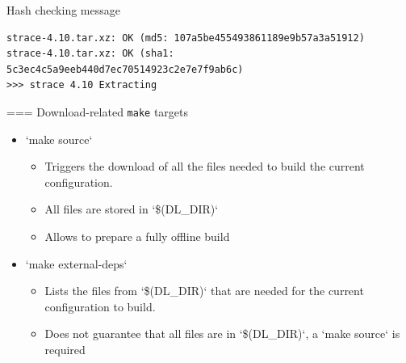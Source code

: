   \begin{block}{Hash checking message}
{\scriptsize
\begin{verbatim}
strace-4.10.tar.xz: OK (md5: 107a5be455493861189e9b57a3a51912)
strace-4.10.tar.xz: OK (sha1: 5c3ec4c5a9eeb440d7ec70514923c2e7e7f9ab6c)
>>> strace 4.10 Extracting
\end{verbatim}}
  \end{block}


=== {Download-related {\tt make} targets}
  \begin{itemize}
  \item `make source`
    \begin{itemize}
    \item Triggers the download of all the files needed to build the
      current configuration.
    \item All files are stored in `\$(DL_DIR)`
    \item Allows to prepare a fully offline build
    \end{itemize}
  \item `make external-deps`
    \begin{itemize}
    \item Lists the files from `\$(DL_DIR)` that are needed for
      the current configuration to build.
    \item Does not guarantee that all files are in `\$(DL_DIR)`, a
      `make source` is required
    \end{itemize}
  \end{itemize}


